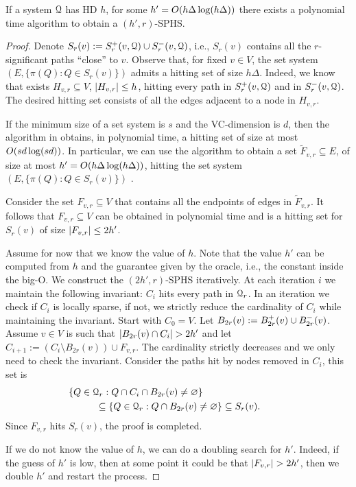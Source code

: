 \begin{proposition}
If a system $\mathcal{Q}$ has HD $h$, for some $h'=O(h\Delta\log(h\Delta))$ there exists a polynomial time algorithm to obtain a $(h',r)$-SPHS.	
\end{proposition}
\begin{proof}
Denote $S_r(v):=S^+_r(v,\mathcal{Q})\cup S^-_r(v,\mathcal{Q})$, i.e., $S_r(v)$ contains all the $r$-significant paths ``close'' to $v$. 
Observe that, for fixed $v\in V$, the set system $(E,\{\pi(Q):Q \in S_r(v)\})$ admits a hitting set of size $h\Delta$.
Indeed, we know that exists $H_{v,r}\subseteq V$, $\lvert H_{v,r}\rvert\leq h$, hitting every path in $S^+_r(v,\mathcal{Q})$ and in $S^-_r(v,\mathcal{Q})$.
The desired hitting set consists of all the edges adjacent to a node in $H_{v,r}$.

If the minimum size of a set system is $s$ and the VC-dimension is $d$, then the algorithm in  obtains, in polynomial time, a hitting set of size at most $O(sd\log(sd))$.
In particular, we can use the algorithm to obtain a set $\tilde F_{v,r}\subseteq E$, of size at most $h'=O(h\Delta\log(h\Delta))$, hitting the set system $(E,\{\pi(Q):Q \in S_r(v)\})$ .

Consider the set $F_{v,r}\subseteq V$ that contains all the endpoints of edges in $\tilde F_{v,r}$.
It follows that $F_{v,r}\subseteq V$ can be obtained in polynomial time and is a hitting set for $S_r(v)$ of size $\lvert F_{v,r}\rvert\leq 2h'$.

Assume for now that we know the value of $h$.
Note that the value $h'$ can be computed from $h$ and the guarantee given by the oracle, i.e., the constant inside the big-O.
We construct the $(2h',r)$-SPHS iteratively.
At each iteration $i$ we maintain the following invariant: $C_i$ hits every path in $\mathcal{Q}_r$.
In an iteration we check if $C_i$ is locally sparse, if not, we strictly reduce the cardinality of $C_i$ while maintaining the invariant.
Start with $C_0=V$. 
Let $B_{2r}(v):=B^+_{2r}(v)\cup B^-_{2r}(v)$.
Assume $v\in V$ is such that $\lvert B_{2r}(v)\cap C_i\rvert>2h'$ and let $C_{i+1}:=(C_i\setminus B_{2r}(v))\cup F_{v,r} $.
The cardinality strictly decreases and we only need to check the invariant.
Consider the paths hit by nodes removed in $C_i$, this set is
\begin{align*}
&\hspace{-1cm}\{Q\in\calQ_r: Q\cap C_i\cap B_{2r}(v)\neq \varnothing\}\\
&\subseteq \{Q\in\calQ_r: Q\cap B_{2r}(v)\neq \varnothing\} \subseteq S_r(v).
\end{align*}
Since $F_{v,r}$ hits $S_r(v)$, the proof is completed.

If we do not know the value of $h$, we can do a doubling search for $h'$. 
Indeed, if the guess of $h'$ is low, then at some point it could be that $\lvert F_{v,r}\rvert>2h'$, then we double $h'$ and restart the process.
\end{proof}